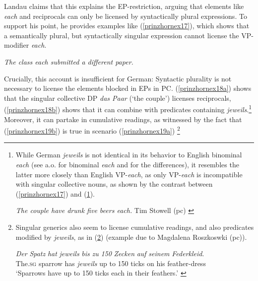 \documentclass[output=paper,colorlinks,citecolor=brown,
]{langscibook}
\begin{document}
Landau claims that this explains the EP-restriction, arguing that elements like \textit{each} and reciprocals can only be licensed by syntactically plural expressions. To support his point, he provides  examples like (\ref{prinzhornex17}), which shows that a semantically plural, but syntactically singular expression cannot license the VP-modifier \textit{each}.


\ea * \textit{The class each submitted a different paper.} \phantom{.}\hfill \cite[49 (66d)]{Landau:2000} \label{prinzhornex17}
\z

Crucially, this account is insufficient for German: Syntactic plurality is not necessary to license the elements  blocked in EPs in PC. (\ref{prinzhornex18a}) shows that the singular collective DP {\it  das Paar} (`the couple') licenses reciprocals,  (\ref{prinzhornex18b}) shows that it can combine with predicates containing \textit{jeweils}.\footnote{While German  \textit{jeweils} is not identical in its behavior to English binominal  \textit{each} (see \citealt{Stowell:2013} a.o. for binominal \textit{each} and \citealt{Zimmermann:2002} for the differences), it resembles the latter more closely than English VP-\textit{each}, as only VP-\textit{each} is incompatible with singular collective nouns, as shown by the contrast between (\ref{prinzhornex17}) and (\ref{prinzhornfnnex5}).

\ea    \textit{The couple have drunk five beers each.} \hfill Tim Stowell (pc)  \label{prinzhornfnnex5} \z  

} Moreover, it can partake in cumulative readings, as witnessed by the fact that (\ref{prinzhornex19b}) is true in scenario (\ref{prinzhornex19a}) \footnote{Singular generics also seem to license cumulative readings,  and also predicates modified by \textit{jeweils}, as in (\ref{prinzhornexfn45}) (example due to Magdalena Roszkoswki (pc)).

\ea 
\gll \textit{Der} \textit{Spatz} \textit{hat} \textit{jeweils} \textit{bis} \textit{zu} \textit{150} \textit{Zecken} \textit{auf} \textit{seinem} \textit{Federkleid}.\\
The.\textsc{sg} sparrow has \textit{jeweils} up to 150 ticks on his feather-dress\\
\glt `Sparrows have up to 150 ticks each in their feathers.'
\label{prinzhornexfn45} 
\z

}
\end{document}
